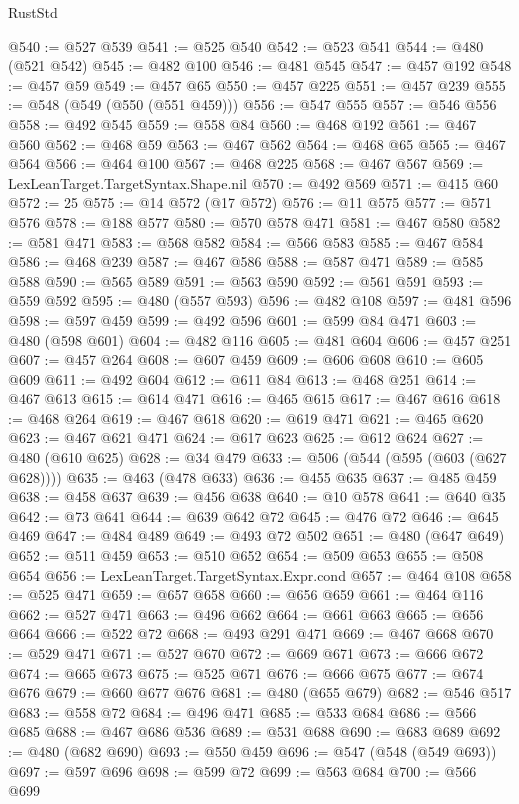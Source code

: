 \begin{lexlean}{RustStd}
\begin{coremodule}
@540 := @527 @539
@541 := @525 @540
@542 := @523 @541
@544 := @480 (@521 @542)
@545 := @482 @100
@546 := @481 @545
@547 := @457 @192
@548 := @457 @59
@549 := @457 @65
@550 := @457 @225
@551 := @457 @239
@555 := @548 (@549 (@550 (@551 @459)))
@556 := @547 @555
@557 := @546 @556
@558 := @492 @545
@559 := @558 @84
@560 := @468 @192
@561 := @467 @560
@562 := @468 @59
@563 := @467 @562
@564 := @468 @65
@565 := @467 @564
@566 := @464 @100
@567 := @468 @225
@568 := @467 @567
@569 := LexLeanTarget.TargetSyntax.Shape.nil
@570 := @492 @569
@571 := @415 @60
@572 := 25
@575 := @14 @572 (@17 @572)
@576 := @11 @575
@577 := @571 @576
@578 := @188 @577
@580 := @570 @578 @471
@581 := @467 @580
@582 := @581 @471
@583 := @568 @582
@584 := @566 @583
@585 := @467 @584
@586 := @468 @239
@587 := @467 @586
@588 := @587 @471
@589 := @585 @588
@590 := @565 @589
@591 := @563 @590
@592 := @561 @591
@593 := @559 @592
@595 := @480 (@557 @593)
@596 := @482 @108
@597 := @481 @596
@598 := @597 @459
@599 := @492 @596
@601 := @599 @84 @471
@603 := @480 (@598 @601)
@604 := @482 @116
@605 := @481 @604
@606 := @457 @251
@607 := @457 @264
@608 := @607 @459
@609 := @606 @608
@610 := @605 @609
@611 := @492 @604
@612 := @611 @84
@613 := @468 @251
@614 := @467 @613
@615 := @614 @471
@616 := @465 @615
@617 := @467 @616
@618 := @468 @264
@619 := @467 @618
@620 := @619 @471
@621 := @465 @620
@623 := @467 @621 @471
@624 := @617 @623
@625 := @612 @624
@627 := @480 (@610 @625)
@628 := @34 @479
@633 := @506 (@544 (@595 (@603 (@627 @628))))
@635 := @463 (@478 @633)
@636 := @455 @635
@637 := @485 @459
@638 := @458 @637
@639 := @456 @638
@640 := @10 @578
@641 := @640 @35
@642 := @73 @641
@644 := @639 @642 @72
@645 := @476 @72
@646 := @645 @469
@647 := @484 @489
@649 := @493 @72 @502
@651 := @480 (@647 @649)
@652 := @511 @459
@653 := @510 @652
@654 := @509 @653
@655 := @508 @654
@656 := LexLeanTarget.TargetSyntax.Expr.cond
@657 := @464 @108
@658 := @525 @471
@659 := @657 @658
@660 := @656 @659
@661 := @464 @116
@662 := @527 @471
@663 := @496 @662
@664 := @661 @663
@665 := @656 @664
@666 := @522 @72
@668 := @493 @291 @471
@669 := @467 @668
@670 := @529 @471
@671 := @527 @670
@672 := @669 @671
@673 := @666 @672
@674 := @665 @673
@675 := @525 @671
@676 := @666 @675
@677 := @674 @676
@679 := @660 @677 @676
@681 := @480 (@655 @679)
@682 := @546 @517
@683 := @558 @72
@684 := @496 @471
@685 := @533 @684
@686 := @566 @685
@688 := @467 @686 @536
@689 := @531 @688
@690 := @683 @689
@692 := @480 (@682 @690)
@693 := @550 @459
@696 := @547 (@548 (@549 @693))
@697 := @597 @696
@698 := @599 @72
@699 := @563 @684
@700 := @566 @699

\end{coremodule}
\end{lexlean}
